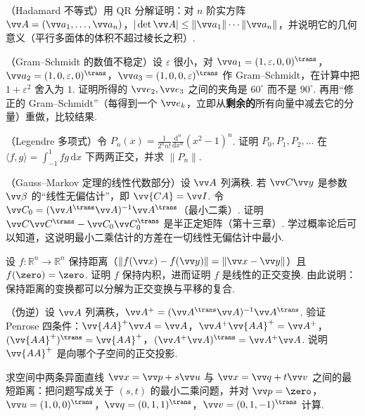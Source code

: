 {		\Cgroup
		\begin{exC}
			\item\label{ex:ip:C1} （Hadamard 不等式）用 QR 分解证明：对 $n$ 阶实方阵 $\vv A=(\vv a_1,\ldots,\vv a_n)$，$|\det\vv A|\le\|\vv a_1\|\cdots\|\vv a_n\|$，并说明它的几何意义（平行多面体的体积不超过棱长之积）.
			\item\label{ex:ip:C2} （Gram–Schmidt 的数值不稳定）设 $\varepsilon$ 很小，对 $\vv a_1=(1,\varepsilon,0,0)^\trans$，$\vv a_2=(1,0,\varepsilon,0)^\trans$，$\vv a_3=(1,0,0,\varepsilon)^\trans$ 作 Gram–Schmidt，在计算中把 $1+\varepsilon^2$ 舍入为 $1$. 证明所得的 $\vv e_2,\vv e_3$ 之间的夹角是 $60^\circ$ 而不是 $90^\circ$. 再用“修正的 Gram–Schmidt”（每得到一个 $\vv e_k$，立即从\textbf{剩余的}所有向量中减去它的分量）重做，比较结果.
			\item\label{ex:ip:C3} （Legendre 多项式）令 $P_n(x)=\frac1{2^nn!}\frac{\mathrm d^n}{\mathrm dx^n}(x^2-1)^n$. 证明 $P_0,P_1,P_2,\ldots$ 在 $\langle f,g\rangle=\int_{-1}^1fg\,\mathrm dx$ 下两两正交，并求 $\|P_n\|$.
			\item\label{ex:ip:C4} （Gauss–Markov 定理的线性代数部分）设 $\vv A$ 列满秩. 若 $\vv C\vv y$ 是参数 $\vv\beta$ 的“线性无偏估计”，即 $\vv{CA}=\vv I$. 令 $\vv C_0=(\vv A^\trans\vv A)^{-1}\vv A^\trans$（最小二乘）. 证明 $\vv C\vv C^\trans-\vv C_0\vv C_0^\trans$ 是半正定矩阵（第十三章）. 学过概率论后可以知道，这说明最小二乘估计的方差在一切线性无偏估计中最小.
			\item\label{ex:ip:C5} 设 $f:\mathbb{R}^n\to\mathbb{R}^n$ 保持距离（$\|f(\vv x)-f(\vv y)\|=\|\vv x-\vv y\|$）且 $f(\zero)=\zero$. 证明 $f$ 保持内积，进而证明 $f$ 是线性的正交变换. 由此说明：保持距离的变换都可以分解为正交变换与平移的复合.
			\item\label{ex:ip:C6} （伪逆）设 $\vv A$ 列满秩，$\vv A^+=(\vv A^\trans\vv A)^{-1}\vv A^\trans$. 验证 Penrose 四条件：$\vv{AA}^+\vv A=\vv A$，$\vv A^+\vv{AA}^+=\vv A^+$，$(\vv{AA}^+)^\trans=\vv{AA}^+$，$(\vv A^+\vv A)^\trans=\vv A^+\vv A$. 说明 $\vv{AA}^+$ 是向哪个子空间的正交投影.
			\item\label{ex:ip:C7} 求空间中两条异面直线 $\vv x=\vv p+s\vv u$ 与 $\vv x=\vv q+t\vv v$ 之间的最短距离：把问题写成关于 $(s,t)$ 的最小二乘问题，并对 $\vv p=\zero$，$\vv u=(1,0,0)^\trans$，$\vv q=(0,1,1)^\trans$，$\vv v=(0,1,-1)^\trans$ 计算.
		\end{exC}
	}
	
